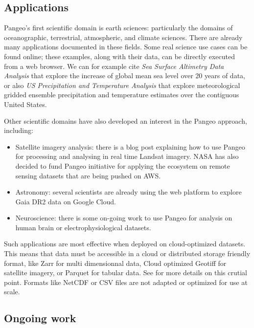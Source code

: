 \documentclass{article}
\begin{document}
\subsection{Applications}
\label{ssec:applications}

Pangeo's first scientific domain is earth sciences: particularly the domains of oceanographic, terrestrial, atmospheric, and climate sciences. There are already many applications documented in these fields. Some real science use cases can be found online\cite{b5}; these examples, along with their data, can be directly executed from a web browser. We can for example cite \textit{Sea Surface Altimetry Data Analysis} that explore the increase of global mean sea level over 20 years of data, or also \textit{US Precipitation and Temperature Analysis} that explore meteorological gridded ensemble precipitation and temperature estimates over the contiguous United States.

Other scientific domains have also developed an interest in the Pangeo approach, including:
\begin{itemize}
\item Satellite imagery analysis: there is a blog post\cite{b6} explaining how to use Pangeo for processing and analysing in real time Landsat imagery. NASA has also decided to fund Pangeo initiative for applying the ecosystem on remote sensing datasets that are being pushed on AWS.
\item Astronomy: several scientists are already using the web platform to explore Gaia DR2 data on Google Cloud.
\item Neuroscience: there is some on-going work to use Pangeo for analysis on human brain or electrophysiological datasets.
\end{itemize}

Such applications are most effective when deployed on cloud-optimized datasets. This means that data must be accessible in a cloud or distributed storage friendly format, like Zarr for multi dimensionnal data, Cloud optimized Geotiff for satellite imagery, or Parquet for tabular data. See \cite{b7} for more details on this crutial point. Formats like NetCDF or CSV files are not adapted or optimized for use at scale.

\subsection{Ongoing work}
\label{ssec:ongowork}
\end{document}
